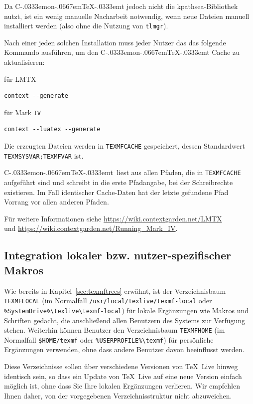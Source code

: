 \documentclass[12pt,ngerman,a4paper,fullparskip]{scrreprt}
\newcommand{\TL}{\TeX\ Live\xspace}
\newcommand{\acro}[1]{\texttt{#1}}
\newcommand{\code}[1]{\texttt{#1}}
\newcommand{\dirname}[1]{\texttt{#1}}
\newcommand\ConTeXt{C\kern-.0333emon\-\kern-.0667em\TeX\kern-.0333emt}
\begin{document}
Da \ConTeXt{}  jedoch nicht die kpathsea-Bibliothek nutzt, ist
ein wenig manuelle Nacharbeit notwendig, wenn neue Dateien manuell installiert werden (also ohne die Nutzung von \verb+tlmgr+).

Nach einer jeden solchen Installation muss jeder Nutzer das das folgende Kommando ausführen, um den \ConTeXt{} Cache zu aktualisieren:

für LMTX

\begin{verbatim}
context --generate
\end{verbatim}

für Mark \acro{IV}

\begin{verbatim}
context --luatex --generate
\end{verbatim}



Die erzeugten Dateien werden in \code{TEXMFCACHE} gespeichert, dessen Standardwert \verb+TEXMSYSVAR;TEXMFVAR+ ist. 

\ConTeXt\ liest aus allen Pfaden, die in \verb+TEXMFCACHE+ aufgeführt sind und schreibt in die erste Pfadangabe, bei der Schreibrechte existieren. Im Fall identischer Cache-Daten hat der letzte gefundene Pfad Vorrang vor allen anderen Pfaden.

Für weitere Informationen siehe \url{https://wiki.contextgarden.net/LMTX}\\
und \url{https://wiki.contextgarden.net/Running_Mark_IV}.

\subsection{Integration lokaler bzw. nutzer-spezifischer Makros}
\label{sec:local-personal-macros}

Wie bereits in Kapitel~\ref{sec:texmftrees} erwähnt, ist der Verzeichnisbaum \dirname{TEXMFLOCAL} (im Normalfall \dirname{/usr/local/texlive/texmf-local} oder \verb|%SystemDrive%\texlive\|\newline \verb|texmf-local|) für lokale Ergänzungen wie Makros und Schriften gedacht, die anschließend allen Benutzern des Systems zur Verfügung stehen. Weiterhin können Benutzer den Verzeichnisbaum \dirname{TEXMFHOME} (im Normalfall \dirname{\$HOME/texmf} oder \verb|%USERPROFILE%\texmf|) für persönliche Ergänzungen verwenden, ohne dass andere Benutzer davon beeinflusst werden.

Diese Verzeichnisse sollen über verschiedene Versionen von \TL hinweg identisch sein, so dass ein Update von \TL auf eine neue Version einfach möglich ist, ohne dass Sie Ihre lokalen Ergänzungen verlieren. Wir empfehlen Ihnen daher, von der vorgegebenen Verzeichnisstruktur nicht abzuweichen.
\end{document}
